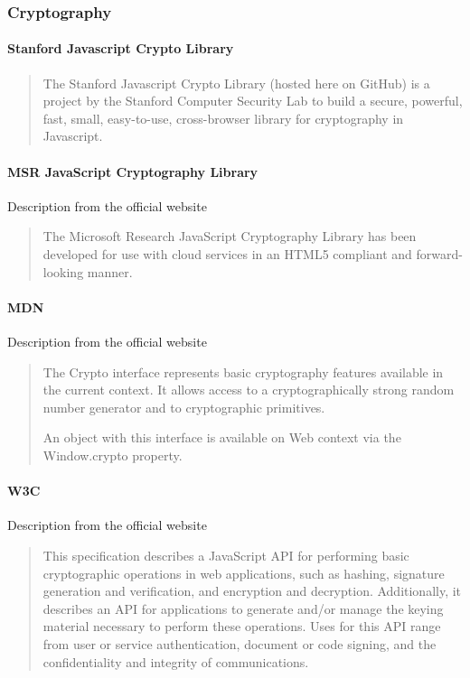 
\subsubsection{Cryptography\cite{Stark2009SymmetricJavascript}}
\paragraph{Stanford Javascript Crypto Library}
\cite{University2009StanfordLibrary}
\blockquote{The Stanford Javascript Crypto Library (hosted here on GitHub) is a project by the Stanford Computer Security Lab to build a secure, powerful, fast, small, easy-to-use, cross-browser library for cryptography in Javascript.}

\paragraph{MSR JavaScript Cryptography Library}
Description from the official website \cite{Microsoft2015MSRLibrary}
\blockquote{The Microsoft Research JavaScript Cryptography Library has been developed for use with cloud services in an HTML5 compliant and forward-looking manner.}

\paragraph{MDN}
Description from the official website \cite{MDN2015MDNCrypto}
\blockquote{The Crypto interface represents basic cryptography features available in the current context. It allows access to a cryptographically strong random number generator and to cryptographic primitives.

An object with this interface is available on Web context via the Window.crypto property.}

\paragraph{W3C}
Description from the official website \cite{Sleevi2014WebAPI}
\blockquote{This specification describes a JavaScript API for performing basic cryptographic operations in web applications, such as hashing, signature generation and verification, and encryption and decryption. Additionally, it describes an API for applications to generate and/or manage the keying material necessary to perform these operations. Uses for this API range from user or service authentication, document or code signing, and the confidentiality and integrity of communications.}

